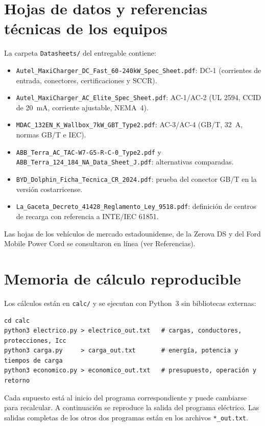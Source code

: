 \section{Hojas de datos y referencias técnicas de los equipos}
\label{sec:datasheets}
La carpeta \texttt{Datasheets/} del entregable contiene:
\begin{itemize}
\item \texttt{Autel\_MaxiCharger\_DC\_Fast\_60-240kW\_Spec\_Sheet.pdf}: DC-1 (corrientes de entrada, conectores, certificaciones y SCCR).
\item \texttt{Autel\_MaxiCharger\_AC\_Elite\_Spec\_Sheet.pdf}: AC-1/AC-2 (UL 2594, CCID de 20~mA, corriente ajustable, NEMA~4).
\item \texttt{MDAC\_132EN\_K\_Wallbox\_7kW\_GBT\_Type2.pdf}: AC-3/AC-4 (GB/T, 32~A, normas GB/T e IEC).
\item \texttt{ABB\_Terra\_AC\_TAC-W7-G5-R-C-0\_Type2.pdf} y \texttt{ABB\_Terra\_124\_184\_NA\_Data\_Sheet\_J.pdf}: alternativas comparadas.
\item \texttt{BYD\_Dolphin\_Ficha\_Tecnica\_CR\_2024.pdf}: prueba del conector GB/T en la versión costarricense.
\item \texttt{La\_Gaceta\_Decreto\_41428\_Reglamento\_Ley\_9518.pdf}: definición de centros de recarga con referencia a INTE/IEC 61851.
\end{itemize}
Las hojas de los vehículos de mercado estadounidense, de la Zerova DS y del Ford Mobile Power Cord se consultaron en línea (ver Referencias).

\section{Memoria de cálculo reproducible}
\label{sec:memoria}
Los cálculos están en \texttt{calc/} y se ejecutan con Python~3 sin bibliotecas externas:
\begin{verbatim}
cd calc
python3 electrico.py > electrico_out.txt   # cargas, conductores, protecciones, Icc
python3 carga.py     > carga_out.txt       # energía, potencia y tiempos de carga
python3 economico.py > economico_out.txt   # presupuesto, operación y retorno
\end{verbatim}
Cada supuesto está al inicio del programa correspondiente y puede cambiarse para recalcular. A continuación se reproduce la salida del programa eléctrico. Las salidas completas de los otros dos programas están en los archivos \texttt{*\_out.txt}.


